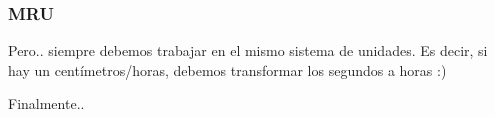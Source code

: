 \documentclass{beamer}
\begin{document}
\begin{frame}
\frametitle{MRU}
% 
 
{\huge                
\xmru
}                                             
 
 
Pero.. siempre debemos trabajar en el mismo sistema de unidades.
Es decir, si hay un cent{\'i}metros/horas,
debemos transformar los 
segundos a horas :)

\begin{center}
\end{center}
                           
 
Finalmente..                                                              
                                                               
                                                               
\end{frame}
\end{document}
